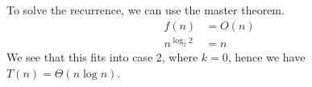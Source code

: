 \begin{parts}
\begin{customsolutionbox}
            To solve the recurrence, we can use the master theorem. 
            \begin{align*}
                f(n) &= O(n) \\
                n^{\log_2 2} &= n 
            \end{align*}
            We see that this fits into case 2, where $k=0$, hence we have $T(n) = \Theta(n \log n)$.
       \end{customsolutionbox}
\end{parts}